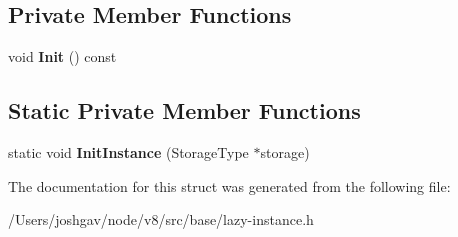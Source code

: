 \subsection*{Private Member Functions}
\begin{DoxyCompactItemize}
\item 
void {\bfseries Init} () const \hypertarget{structv8_1_1base_1_1_lazy_instance_impl_ae4d9da82b0e11133d1d1f3f9b92d0301}{}\label{structv8_1_1base_1_1_lazy_instance_impl_ae4d9da82b0e11133d1d1f3f9b92d0301}

\end{DoxyCompactItemize}
\subsection*{Static Private Member Functions}
\begin{DoxyCompactItemize}
\item 
static void {\bfseries Init\+Instance} (Storage\+Type $\ast$storage)\hypertarget{structv8_1_1base_1_1_lazy_instance_impl_ac3af0e75c3a1da850cfd8d8d32ca3e11}{}\label{structv8_1_1base_1_1_lazy_instance_impl_ac3af0e75c3a1da850cfd8d8d32ca3e11}

\end{DoxyCompactItemize}


The documentation for this struct was generated from the following file\+:\begin{DoxyCompactItemize}
\item 
/\+Users/joshgav/node/v8/src/base/lazy-\/instance.\+h\end{DoxyCompactItemize}
